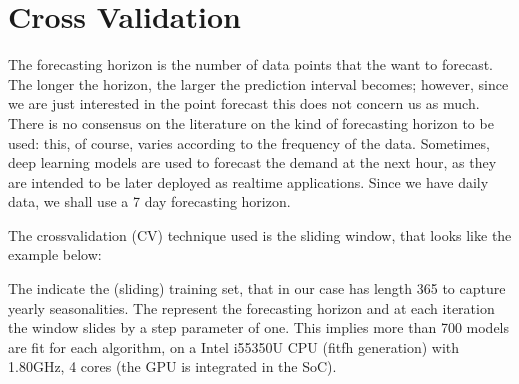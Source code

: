 \documentclass[letterpaper,10pt,english]{jupyterBook}
\begin{document}
\section{Cross Validation}
\label{\detokenize{06-forecasting:cross-validation}}
\sphinxAtStartPar
The forecasting horizon is the number of data points that the want to forecast. The longer the horizon, the larger the prediction interval becomes; however, since we are just interested in the point forecast this does not concern us as much. There is no consensus on the literature on the kind of forecasting horizon  to be used: this, of course, varies according to the frequency of the data. Sometimes, deep learning models are used to forecast the demand at the next hour, as they are intended to be later deployed as real\sphinxhyphen{}time applications. Since we have daily data, we shall use a 7 day forecasting horizon.

\sphinxAtStartPar
The cross\sphinxhyphen{}validation (CV) technique used is the sliding window, that looks like the example below:

\begin{sphinxVerbatim}[commandchars=\\\{\}]
            
            
            
            
\end{sphinxVerbatim}

\sphinxAtStartPar
The \sphinxcode{\sphinxupquote{*}} indicate the (sliding) training set, that in our case has length 365 \sphinxhyphen{} to capture yearly seasonalities. The  represent the forecasting horizon  and at each iteration the window slides by a step parameter of one. This implies more than 700 models are fit for each algorithm, on a Intel i5\sphinxhyphen{}5350U CPU (fitfh generation) with 1.80GHz, 4 cores (the GPU is integrated in the SoC).
\end{document}
